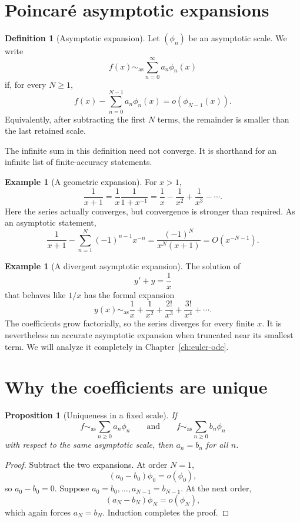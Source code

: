 \documentclass[11pt,oneside]{book}
\newtheorem{proposition}[theorem]{Proposition}
\theoremstyle{definition}
\newtheorem{definition}[theorem]{Definition}
\newtheorem{example}[theorem]{Example}
\theoremstyle{remark}
\newcommand{\asympseries}{\sim_{\!\mathrm{as}}}
\newcommand{\smallo}{o}
\newcommand{\bigO}{O}
\begin{document}
\section{Poincar\'e asymptotic expansions}

\begin{definition}[Asymptotic expansion]
Let $(\phi_n)$ be an asymptotic scale. We write
\[
  f(x)\asympseries \sum_{n=0}^{\infty} a_n\phi_n(x)
\]
if, for every $N\ge1$,
\[
  f(x)-\sum_{n=0}^{N-1}a_n\phi_n(x)=\smallo(\phi_{N-1}(x)).
\]
Equivalently, after subtracting the first $N$ terms, the remainder is smaller
than the last retained scale.
\end{definition}

The infinite sum in this definition need not converge. It is shorthand for an
infinite list of finite-accuracy statements.

\begin{example}[A geometric expansion]
For $x>1$,
\[
  \frac1{x+1}=\frac1x\frac1{1+x^{-1}}
  =\frac1x-\frac1{x^2}+\frac1{x^3}-\cdots.
\]
Here the series actually converges, but convergence is stronger than required.
As an asymptotic statement,
\[
  \frac1{x+1}-\sum_{n=1}^{N}(-1)^{n-1}x^{-n}
  =\frac{(-1)^N}{x^N(x+1)}=\bigO(x^{-N-1}).
\]
\end{example}

\begin{example}[A divergent asymptotic expansion]
The solution of
\[
  y'+y=\frac1x
\]
that behaves like $1/x$ has the formal expansion
\[
  y(x)\asympseries \frac1x+\frac1{x^2}+\frac{2!}{x^3}
       +\frac{3!}{x^4}+\cdots.
\]
The coefficients grow factorially, so the series diverges for every finite $x$.
It is nevertheless an accurate asymptotic expansion when truncated near its
smallest term. We will analyze it completely in
Chapter~\ref{ch:euler-ode}.
\end{example}

\section{Why the coefficients are unique}

\begin{proposition}[Uniqueness in a fixed scale]
If
\[
 f\asympseries\sum_{n\ge0}a_n\phi_n
 \qquad\text{and}\qquad
 f\asympseries\sum_{n\ge0}b_n\phi_n
\]
with respect to the same asymptotic scale, then $a_n=b_n$ for all $n$.
\end{proposition}

\begin{proof}
Subtract the two expansions. At order $N=1$,
\[
  (a_0-b_0)\phi_0=\smallo(\phi_0),
\]
so $a_0-b_0=0$. Suppose $a_0=b_0,\ldots,a_{N-1}=b_{N-1}$. At the next
order,
\[
  (a_N-b_N)\phi_N=\smallo(\phi_N),
\]
which again forces $a_N=b_N$. Induction completes the proof.
\end{proof}
\end{document}
